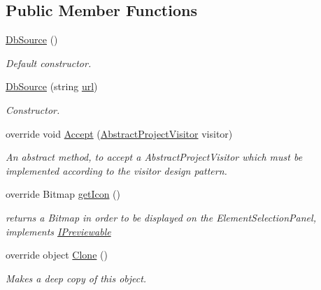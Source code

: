 \subsection*{Public Member Functions}
\begin{DoxyCompactItemize}
\item 
\hyperlink{class_a_rdev_kit_1_1_model_1_1_project_1_1_db_source_a44cad2325f3fcee5ed95c0a57ada9a1d}{Db\-Source} ()
\begin{DoxyCompactList}\small\item\em Default constructor. \end{DoxyCompactList}\item 
\hyperlink{class_a_rdev_kit_1_1_model_1_1_project_1_1_db_source_a80e5da6929dee8cf0ecb51b4da394df2}{Db\-Source} (string \hyperlink{class_a_rdev_kit_1_1_model_1_1_project_1_1_db_source_ac6b9cc43f2dee23b83d8783c81a07407}{url})
\begin{DoxyCompactList}\small\item\em Constructor. \end{DoxyCompactList}\item 
override void \hyperlink{class_a_rdev_kit_1_1_model_1_1_project_1_1_db_source_aaa7e395578b8e983de0392dd37c55c93}{Accept} (\hyperlink{class_a_rdev_kit_1_1_controller_1_1_project_controller_1_1_abstract_project_visitor}{Abstract\-Project\-Visitor} visitor)
\begin{DoxyCompactList}\small\item\em An abstract method, to accept a Abstract\-Project\-Visitor which must be implemented according to the visitor design pattern. \end{DoxyCompactList}\item 
override Bitmap \hyperlink{class_a_rdev_kit_1_1_model_1_1_project_1_1_db_source_a0890127d66db4ce9c3daa6fe6f44f157}{get\-Icon} ()
\begin{DoxyCompactList}\small\item\em returns a Bitmap in order to be displayed on the Element\-Selection\-Panel, implements \hyperlink{interface_a_rdev_kit_1_1_model_1_1_project_1_1_i_previewable}{I\-Previewable} \end{DoxyCompactList}\item 
override object \hyperlink{class_a_rdev_kit_1_1_model_1_1_project_1_1_db_source_a9c58ffefa3fd6d23d58392273be07d17}{Clone} ()
\begin{DoxyCompactList}\small\item\em Makes a deep copy of this object. \end{DoxyCompactList}\end{DoxyCompactItemize}
